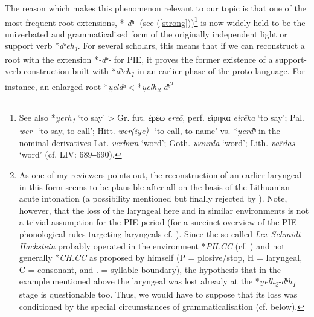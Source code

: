 \documentclass[output=paper,colorlinks,citecolor=brown]{langscibook}
\begin{document}
The reason which makes this phenomenon relevant to our topic is that one of the most frequent root extensions, *\textit{-dʰ-} (see (\ref{strong}))\footnote{See also *\textit{u̯erh\textsubscript{1}} ‘to say’ > Gr. fut. ἐρέω \textit{ereō}, perf. εἴρηκα \textit{eirēka} ‘to say’; Pal. \textit{wer-} ‘to say, to call’; Hitt. \textit{wer(iye)-} ‘to call, to name’ vs. *\textit{u̯erdʰ} in the nominal derivatives Lat. \textit{verbum} ‘word’; Goth. \textit{waurda} ‘word’; Lith. \textit{var̃das} ‘word’ (cf. LIV: 689‒690).} is now widely held to be the univerbated and grammaticalised form of the originally independent light or support verb *\textit{dʰeh\textsubscript{1}}. For several scholars, this means that if we can reconstruct a root with the extension *\textit{-dʰ-} for PIE, it proves the former existence of a support-verb construction built with *\textit{dʰeh\textsubscript{1}} in an earlier phase of the proto-language. For instance, an enlarged root *\textit{u̯eldʰ} < *\textit{u̯elh\textsubscript{2}-dʰ}\footnote{As one of my reviewers points out, the reconstruction of an earlier laryngeal in this form seems to be plausible after all on the basis of the Lithuanian acute intonation (a possibility mentioned but finally rejected by \citealt[472--473]{Kümmel2000}). Note, however, that the loss of the laryngeal here and in similar environments is not a trivial assumption for the PIE period (for a succinct overview of the PIE phonological rules targeting laryngeals cf. \citealt[25--27]{Byrd2015}). Since the so-called \textit{Lex Schmidt-Hackstein} probably operated in the environment *\textit{PH.CC} (cf. \citealt[134]{Byrd2015}) and not generally *\textit{CH.CC} as proposed by \citet{Hackstein2002b} himself (P = plosive/stop, H = laryngeal, C = consonant, and . = syllable boundary), the hypothesis that in the example mentioned above the laryngeal was lost already at the *\textit{u̯elh\textsubscript{2}-dʰh\textsubscript{1}} stage is questionable too. Thus, we would have to suppose that its loss was conditioned by the special circumstances of grammaticalisation (cf. below).}
\end{document}
